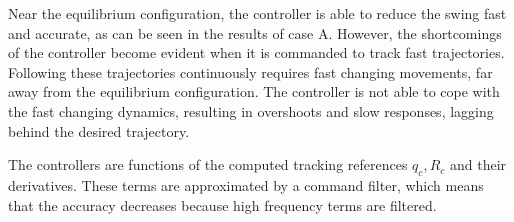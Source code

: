 Near the equilibrium configuration, the  controller is able to reduce the swing fast and accurate, as can be seen in the results of case A. 
However, the shortcomings of the  controller become evident when it is commanded to track fast trajectories. Following these trajectories continuously requires fast changing movements, far away from the equilibrium configuration. The controller is not able to cope with the fast changing dynamics, resulting in overshoots and slow responses, lagging behind the desired trajectory.

The controllers are functions of the computed tracking references $ q_c, R_c $ and their derivatives. These terms are approximated by a command filter, which means that the accuracy decreases because high frequency terms are filtered.






